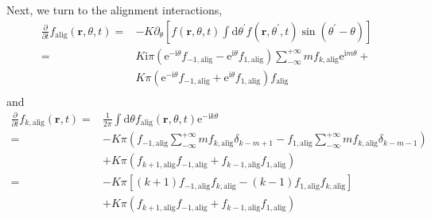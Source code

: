 \documentclass[10pt,aspectratio=43,mathserif,table]{beamer}
\begin{document}
\begin{frame}
    \small
    Next, we turn to the alignment interactions,
    \begin{equation}
        \begin{aligned}
            \frac{\partial}{\partial t}f_{\mathrm{alig}}\left( \mathbf{r},\theta ,t \right) =&-K\partial _{\theta}\left[f\left( \mathbf{r},\theta ,t \right) \int{\mathrm{d}\theta ^{\prime}f\left( \mathbf{r},\theta ^{\prime},t \right) \sin \left( \theta ^{\prime}-\theta \right)}\right]\\
            =&K\mathrm{i}\pi \left( \mathrm{e}^{-\mathrm{i}\theta}f_{-1,\mathrm{alig}}-\mathrm{e}^{\mathrm{i}\theta}f_{1,\mathrm{alig}} \right) \sum_{-\infty}^{+\infty}{mf_{k,\mathrm{alig}}\mathrm{e}^{\mathrm{i}m\theta}}+\\
            &K\pi \left( \mathrm{e}^{-\mathrm{i}\theta}f_{-1,\mathrm{alig}}+\mathrm{e}^{\mathrm{i}\theta}f_{1,\mathrm{alig}} \right) f_{\mathrm{alig}}\\
        \end{aligned}
    \end{equation}
    and
    \begin{equation}
        \begin{aligned}
            \frac{\partial}{\partial t}f_{k,\mathrm{alig}}\left( \mathbf{r},t \right) =&\frac{1}{2\pi}\int{\mathrm{d}\theta f_{\mathrm{alig}}\left( \mathbf{r},\theta ,t \right) \mathrm{e}^{-\mathrm{i}k\theta}}\\
            =&-K\pi \left( f_{-1,\mathrm{alig}}\sum_{-\infty}^{+\infty}{mf_{k,\mathrm{alig}}\delta _{k-m+1}}-f_{1,\mathrm{alig}}\sum_{-\infty}^{+\infty}{mf_{k,\mathrm{alig}}\delta _{k-m-1}} \right) \\
            &+K\pi \left( f_{k+1,\mathrm{alig}}f_{-1,\mathrm{alig}}+f_{k-1,\mathrm{alig}}f_{1,\mathrm{alig}} \right)\\
            =&-K\pi \left[ \left( k+1 \right) f_{-1,\mathrm{alig}}f_{k,\mathrm{alig}}-\left( k-1 \right) f_{1,\mathrm{alig}}f_{k,\mathrm{alig}} \right] \\
            &+K\pi \left( f_{k+1,\mathrm{alig}}f_{-1,\mathrm{alig}}+f_{k-1,\mathrm{alig}}f_{1,\mathrm{alig}} \right) \\
        \end{aligned}
    \end{equation}
\end{frame}
\end{document}
